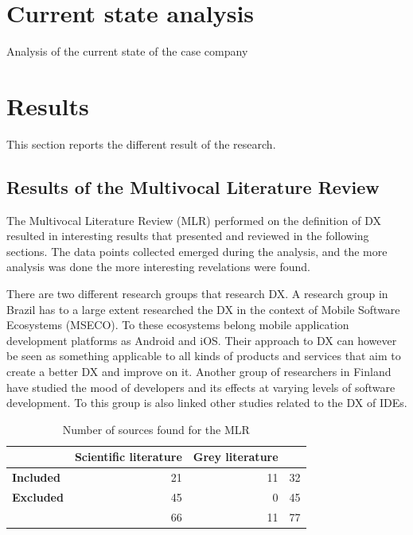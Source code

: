 \documentclass[english, 12pt, a4paper, sci, utf8, a-1b, online]{aaltothesis}
\begin{document}
\section{Current state analysis}

Analysis of the current state of the case company

\clearpage
\section{Results}

This section reports the different result of the research.

\subsection{Results of the Multivocal Literature Review} \label{section:result-of-mlr}

The Multivocal Literature Review (MLR) performed on the definition of DX resulted in interesting results that presented and reviewed in the following sections. The data points collected emerged during the analysis, and the more analysis was done the more interesting revelations were found.

There are two different research groups that research DX. A research group in Brazil has to a large extent researched the DX in the context of Mobile Software Ecosystems (MSECO). To these ecosystems belong mobile application development platforms as Android and iOS. Their approach to DX can however be seen as something applicable to all kinds of products and services that aim to create a better DX and improve on it. Another group of researchers in Finland have studied the mood of developers and its effects at varying levels of software development. To this group is also linked other studies related to the DX of IDEs.


\begin{table}[ht]
  \begin{center}
    \begin{tabular}{l | r r | r}
                        & \textbf{Scientific literature} & \textbf{Grey literature} &    \\
      \hline
      \textbf{Included} & 21                             & 11                       & 32 \\
      \textbf{Excluded} & 45                             & 0                        & 45 \\
      \hline
                        & 66                             & 11                       & 77
    \end{tabular}
    \captionsetup{width=0.6\textwidth}
    \caption{Number of sources found for the MLR}
    \label{table:number-of-sources}
  \end{center}
\end{table}
\end{document}

